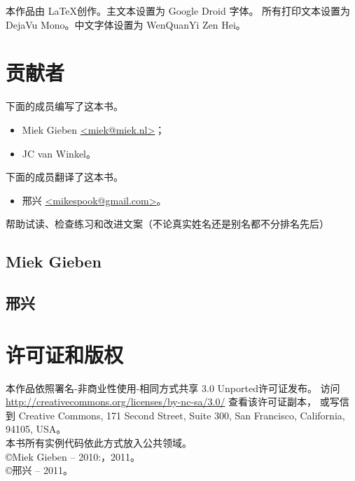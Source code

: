 \noindent{}本作品由 \LaTeX 创作。主文本设置为 Google Droid 字体。
所有打印文本设置为 DejaVu Mono。中文字体设置为 WenQuanYi Zen Hei。

\section{贡献者}
下面的成员编写了这本书。
\begin{itemize}
\item{Miek Gieben \qquad\url{<miek@miek.nl>}}；
\item{JC van Winkel}。
\end{itemize}
下面的成员翻译了这本书。
\begin{itemize}
    \item{邢兴 \qquad\url{<mikespook@gmail.com>}}。
\end{itemize}

帮助试读、检查练习和改进文案（不论真实姓名还是别名都不分排名先后）


\subsection{Miek Gieben}


\subsection{邢兴}


\section{许可证和版权}

本作品依照署名-非商业性使用-相同方式共享 3.0 Unported许可证发布。
访问 \url{http://creativecommons.org/licenses/by-nc-sa/3.0/} 查看该许可证副本，
或写信到 Creative Commons, 171 Second Street, Suite 300,
San Francisco, California, 94105, USA。\\
本书所有实例代码依此方式放入公共领域。\\
\copyright Miek Gieben -- 2010:，2011。\\
\copyright 邢兴 -- 2011。
